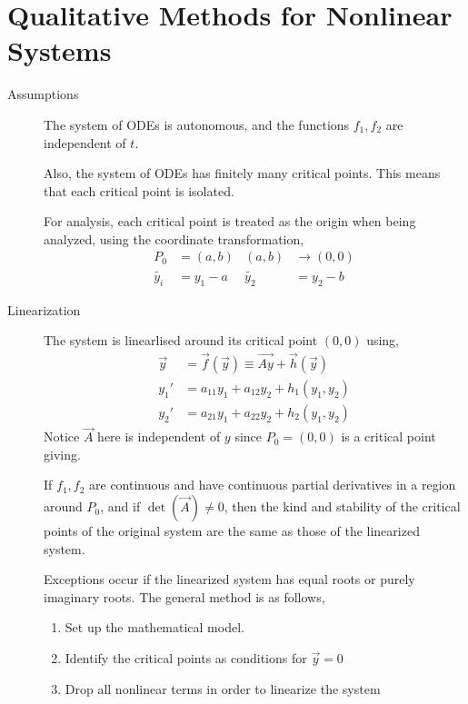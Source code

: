 \section{Qualitative Methods for Nonlinear Systems}
\begin{description}
    \item[Assumptions] The system of ODEs is autonomous, and the functions $ f_1, f_2 $
        are independent of $ t $. \par
        Also, the system of ODEs has finitely many critical points. This
        means that each critical point is isolated. \par
        For analysis, each critical point is treated as the origin when being analyzed,
        using the coordinate transformation,
        \begin{align}
            P_0         & = (a, b)  & (a, b)      & \to (0, 0) \\
            \tilde{y_i} & = y_1 - a & \tilde{y_2} & = y_2 - b
        \end{align}
    \item[Linearization] The system is linearlised around its critical point
        $ (0, 0) $ using,
        \begin{align}
            \vec{y} & = \vec{f}(\vec{y}) \equiv \vec{Ay} + \vec{h}(\vec{y}) \\
            y_1'    & = a_{11}y_1 + a_{12}y_2 + h_1(y_1, y_2)               \\
            y_2'    & = a_{21}y_1 + a_{22}y_2 + h_2(y_1, y_2)
        \end{align}
        Notice $ \vec{A} $ here is independent of $ y $ since $ P_0  = (0, 0)$ is
        a critical point giving. \par
        If $ f_1, f_2 $ are continuous and have continuous partial derivatives in a
        region around $ P_0 $, and if $ \det(\vec{A}) \neq 0 $, then the kind and
        stability of the critical points of the original system are the same as
        those of the linearized system. \par
        Exceptions occur if the linearized system has equal roots or purely imaginary
        roots.
        The general method is as follows,
        \begin{enumerate}
            \item Set up the mathematical model.
            \item Identify the critical points as conditions for $ \vec{y} = 0 $
            \item Drop all nonlinear terms in order to linearize the system

\end{enumerate}
\end{description}
